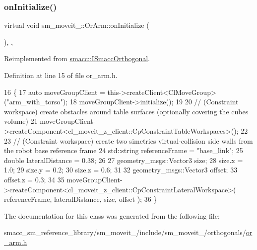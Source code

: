 \subsubsection{\texorpdfstring{on\+Initialize()}{onInitialize()}}
{\footnotesize\ttfamily virtual void sm\+\_\+moveit\+\_\+::\+Or\+Arm\+::on\+Initialize (\begin{DoxyParamCaption}{ }\end{DoxyParamCaption})\hspace{0.3cm}{\ttfamily [inline]}, {\ttfamily [override]}, {\ttfamily [virtual]}}



Reimplemented from \hyperlink{classsmacc_1_1ISmaccOrthogonal_a6bb31c620cb64dd7b8417f8705c79c7a}{smacc\+::\+I\+Smacc\+Orthogonal}.



Definition at line 15 of file or\+\_\+arm.\+h.


\begin{DoxyCode}
16         \{
17             \textcolor{keyword}{auto} moveGroupClient = this->createClient<ClMoveGroup>(\textcolor{stringliteral}{"arm\_with\_torso"});
18             moveGroupClient->initialize();
19 
20             \textcolor{comment}{// (Constraint workspace) create obstacles around table surfaces (optionally covering the cubes
       volume)}
21             moveGroupClient->createComponent<cl\_moveit\_z\_client::CpConstraintTableWorkspaces>();
22 
23             \textcolor{comment}{// (Constraint workspace) create two simetrics virtual-collision side walls from the robot base
       reference frame}
24             std::string referenceFrame = \textcolor{stringliteral}{"base\_link"};
25             \textcolor{keywordtype}{double} lateralDistance = 0.38;
26 
27             geometry\_msgs::Vector3 size;
28             size.x = 1.0;
29             size.y = 0.2;
30             size.z = 0.6;
31 
32             geometry\_msgs::Vector3 offset;
33             offset.z = 0.3;
34                         
35             moveGroupClient->createComponent<cl\_moveit\_z\_client::CpConstraintLateralWorkspace>(
      referenceFrame, lateralDistance, size, offset );
36         \}
\end{DoxyCode}


The documentation for this class was generated from the following file\+:\begin{DoxyCompactItemize}
\item 
smacc\+\_\+sm\+\_\+reference\+\_\+library/sm\+\_\+moveit\+\_/include/sm\+\_\+moveit\+\_/orthogonals/\hyperlink{4_2include_2sm__moveit__4_2orthogonals_2or__arm_8h}{or\+\_\+arm.\+h}\end{DoxyCompactItemize}
